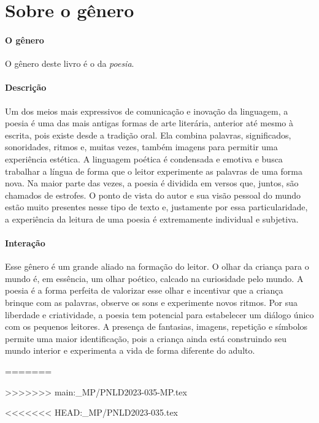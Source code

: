 \documentclass[11pt]{extarticle}
\begin{document}
\section{Sobre o gênero}

\paragraph{O gênero} O gênero deste livro é o da \textit{poesia}. 

\paragraph{Descrição} Um dos meios mais expressivos de comunicação e inovação da linguagem, a poesia é uma das mais antigas formas de arte literária, anterior até mesmo à escrita, pois existe desde a tradição oral. Ela combina palavras, significados, sonoridades, ritmos e, muitas vezes, também imagens para permitir uma experiência estética. A linguagem poética é condensada e emotiva e busca trabalhar a língua de forma que o leitor experimente as palavras de uma forma nova. Na maior parte das vezes, a poesia é dividida em versos que, juntos, são chamados de estrofes. O ponto de vista do autor e sua visão pessoal do mundo estão muito presentes nesse tipo de texto e, justamente por essa particularidade, a experiência da leitura de uma poesia é extremamente individual e subjetiva.

\paragraph{Interação} Esse gênero é um grande aliado na formação do leitor. O olhar da criança para o mundo é, em essência, um olhar poético, calcado na curiosidade pelo mundo. A poesia é a forma perfeita de valorizar esse olhar e incentivar que a criança brinque com as palavras, observe os sons e experimente novos ritmos. Por sua liberdade e criatividade, a poesia tem potencial para estabelecer um diálogo único com os pequenos leitores. A presença de fantasias, imagens, repetição e símbolos permite uma maior identificação, pois a criança ainda está construindo seu mundo interior e experimenta a vida de forma diferente do adulto. 

=======


>>>>>>> main:_MP/PNLD2023-035-MP.tex



<<<<<<< HEAD:_MP/PNLD2023-035.tex
 
\end{document}
